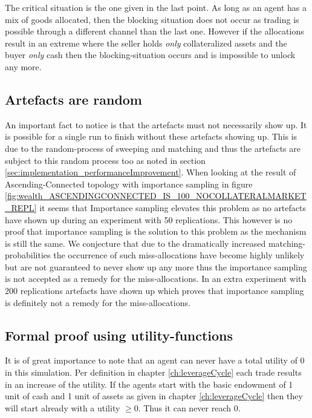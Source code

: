 \documentclass[Bachelorarbeit.tex]{subfiles}
\begin{document}
The critical situation is the one given in the last point. As long as an agent has a mix of goods allocated, then the blocking situation does not occur as trading is possible through a different channel than the last one. However if the allocations result in an extreme where the seller holds \textit{only} collateralized assets and the buyer \textit{only} cash then the blocking-situation occurs and is impossible to unlock any more.

\subsection{Artefacts are random} An important fact to notice is that the artefacts must not necessarily show up. It is possible for a single run to finish without these artefacts showing up. This is due to the random-process of sweeping and matching and thus the artefacts are subject to this random process too as noted in section \ref{sec:implementation_performanceImprovement}. When looking at the result of Ascending-Connected topology with importance sampling in figure \ref{fig:wealth_ASCENDINGCONNECTED_IS_100_NOCOLLATERALMARKET_REPL} it seems that Importance sampling elevates this problem as no artefacts have shown up during an experiment with 50 replications. This however is no proof that importance sampling is the solution to this problem as the mechanism is still the same. We conjecture that due to the dramatically increased matching-probabilities the occurrence of such miss-allocations have become highly unlikely but are not guaranteed to never show up any more thus the importance sampling is not accepted as a remedy for the miss-allocations. In an extra experiment with 200 replications artefacts have shown up which proves that importance sampling is definitely not a remedy for the miss-allocations.

\subsection{Formal proof using utility-functions}
It is of great importance to note that an agent can never have a total utility of 0 in this simulation. Per definition in chapter \ref{ch:leverageCycle} each trade results in an increase of the utility. If the agents start with the basic endowment of 1 unit of cash and 1 unit of assets as given in chapter \ref{ch:leverageCycle} then they will start already with a utility $\geq 0$. Thus it can never reach 0.

\medskip
\end{document}
